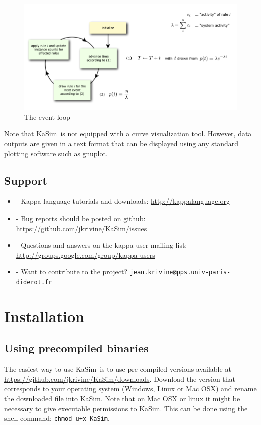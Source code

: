 \documentclass[11pt]{book}
\def\KaSim{\textsf{KaSim}}
\def\ttt#1{\texttt{#1}}
\def\ITE#1{\begin{itemize}#1\end{itemize}}
\begin{document}
\begin{figure}[htbp]
\begin{center}
\includegraphics[width=14cm]{img/event-loop.png}
\caption{The event loop}
\label{fig:event-loop}
\end{center}
\end{figure}

Note that \KaSim~is not equipped with a curve visualization tool. However, data outputs are given in a text format that can be displayed using any standard plotting software such as \href{http://www.gnuplot.info/}{gnuplot}.

\section{Support}
\ITE{
\item[-] Kappa language tutorials and downloads: \url{http://kappalanguage.org}
\item[-] Bug reports should be posted on github: \url{https://github.com/jkrivine/KaSim/issues}
\item[-] Questions and answers on the kappa-user mailing list: \url{http://groups.google.com/group/kappa-users}
\item[-] Want to contribute to the project? \ttt{jean.krivine@pps.univ-paris-diderot.fr}
}

\chapter{Installation}\label{chap:install}

\section{Using precompiled binaries}
The easiest way to use \KaSim~is to use pre-compiled versions available at \url{https://github.com/jkrivine/KaSim/downloads}. Download the version that corresponds to your operating system (Windows, Linux or Mac OSX) and rename the downloaded file into \KaSim. Note that on Mac OSX or linux it might be necessary to give executable permissions to \KaSim. This can be done using the shell command:  
\ttt{chmod u+x KaSim}. 
\end{document}
